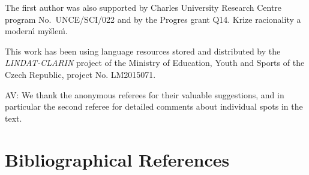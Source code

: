 \documentclass[10pt, a4paper]{article}
\newcommand{\av}[1]{{\color{ansa} AV: #1}}
\begin{document}
The first author was also supported by Charles University Research Centre program No.\ UNCE/SCI/022 and by the Progres grant Q14. Krize racionality a {modern\'\i} my\v{s}len\'\i.

This work has been using language resources stored and distributed by the \textit{LINDAT-CLARIN} project of the Ministry of Education, Youth and Sports of the Czech Republic, project No. LM2015071.

\av{We thank the anonymous referees for their valuable suggestions, and in particular the second referee for detailed comments about individual spots in the text.}



\section{Bibliographical References}
\label{main:ref}




\end{document}
